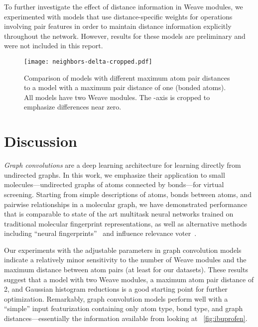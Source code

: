 To further investigate the effect of distance information in Weave modules, we
experimented with models that use distance-specific weights for
operations involving pair features in order to maintain distance information
explicitly throughout the network. However, results for these models are preliminary and
were not included in this report.

\begin{figure}[tb]
\centering
  \texttt{[image: neighbors-delta-cropped.pdf]}
  \caption{
    Comparison of models with different maximum atom pair distances to a model
    with a maximum pair distance of one (bonded atoms). All models have two
    Weave modules. The -axis is cropped to emphasize differences near zero.
  }
  \label{fig:neighbors_delta}
\end{figure}

\section{Discussion}\label{sec:discussion}

\emph{Graph convolutions} are a deep learning architecture for learning directly
from undirected graphs. In this work, we emphasize their application to small
molecules---undirected graphs of atoms connected by bonds---for virtual
screening. Starting from simple descriptions of atoms, bonds between atoms, and
pairwise relationships in a molecular graph, we have demonstrated performance
that is comparable to state of the art multitask neural networks trained on
traditional molecular fingerprint representations, as well as alternative
methods including ``neural fingerprints''~\citep{duvenaud2015convolutional} and
influence relevance voter~\citep{swamidass2009influence}.

Our experiments with the adjustable parameters in graph convolution models
indicate a relatively minor sensitivity to the number of Weave modules and the
maximum distance between atom pairs (at least for our datasets). These results suggest that a
model with two Weave modules, a maximum atom pair distance of 2, and
Gaussian histogram reductions is a good starting point for further optimization.
Remarkably, graph
convolution models perform well with a ``simple'' input featurization containing
only atom type, bond type, and graph distances---essentially the information
available from looking at \figurename~\ref{fig:ibuprofen}.

